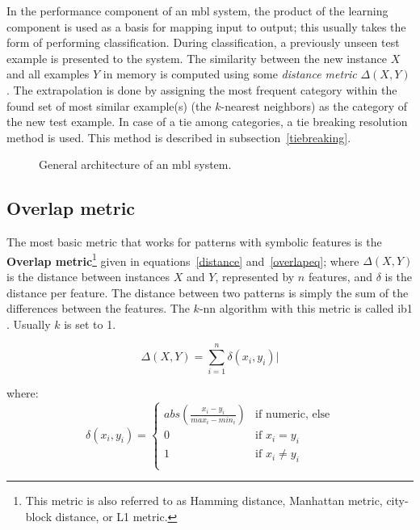 \documentclass{report}
\begin{document}
In the performance component of an {\sc mbl} system, the product of
the learning component is used as a basis for mapping input to output;
this usually takes the form of performing classification.  During
classification, a previously unseen test example is presented to the
system. The similarity between the new instance $X$ and all examples
$Y$ in memory is computed using some {\em distance metric}
$\Delta(X,Y)$. The extrapolation is done by assigning the most
frequent category within the found set of most similar example(s) (the
$k$-nearest neighbors) as the category of the new test example. In
case of a tie among categories, a tie breaking resolution method is
used. This method is described in subsection~\ref{tiebreaking}.

\begin{figure}[htb]
        \begin{center}
                \leavevmode
                \epsfxsize=8cm
                \caption{General architecture of an {\sc mbl} system.
                }
                \label{mbl-method}
        \end{center}
\end{figure}

\subsection{Overlap metric}
\label{overlap}

The most basic metric that works for patterns with symbolic features
is the {\bf Overlap metric}\footnote{This metric is also referred to
as Hamming distance, Manhattan metric, city-block distance, or L1
metric.} given in equations~\ref{distance} and~\ref{overlapeq}; where
$\Delta(X,Y)$ is the distance between instances $X$ and $Y$,
represented by $n$ features, and $\delta$ is the distance per
feature. The distance between two patterns is simply the sum of the
differences between the features. The $k$-{\sc nn} algorithm with this
metric is called {\sc ib1} \cite{Aha+91}. Usually $k$ is set to 1.

\begin{equation}
\Delta(X,Y) = \sum_{i=1}^{n} \delta(x_{i},y_{i}) |
\label{distance}
\end{equation}

where:
\begin{equation}
\delta(x_{i}, y_{i}) = \left\{ \begin{array}{ll}
		abs(\frac{x_{i}-y_{i}}{max_{i}-min_{i}}) & \mbox{if numeric, else}\\
		0 & \mbox{if $x_{i} = y_{i}$}\\
		1 & \mbox{if $x_{i} \neq y_{i}$}\\
	\end{array} \right.
\label{overlapeq}
\end{equation}
\end{document}
